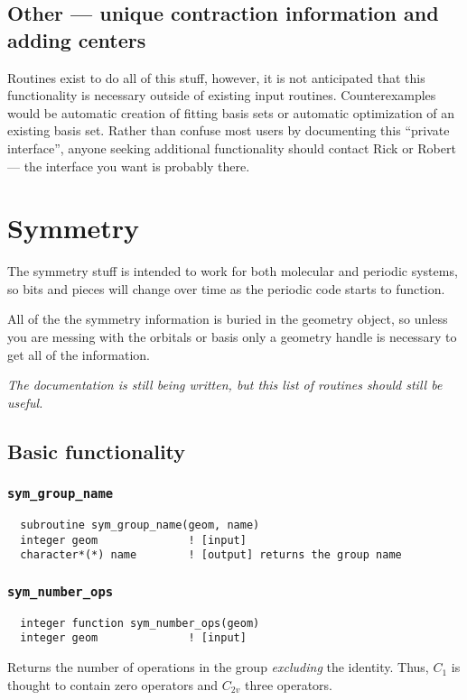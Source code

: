 \subsection{Other --- unique contraction information and adding
centers}

Routines exist to do all of this stuff, however, it is not anticipated
that this functionality is necessary outside of existing input
routines.  Counterexamples would be automatic creation of fitting
basis sets or automatic optimization of an existing basis set.
Rather than confuse most users by documenting this ``private
interface'', anyone seeking additional functionality should contact
Rick or Robert --- the interface you want is probably there.

\section{Symmetry}

  The symmetry stuff is intended to work for both molecular and
periodic systems, so bits and pieces will change over time as the
periodic code starts to function.

  All of the the symmetry information is buried in the geometry
object, so unless you are messing with the orbitals or basis only a
geometry handle is necessary to get all of the information.

{\em The documentation is still being written, but this list of
  routines should still be useful.}

\subsection{Basic functionality}

\subsubsection{{\tt sym\_group\_name}}
\begin{verbatim}
  subroutine sym_group_name(geom, name)
  integer geom              ! [input]
  character*(*) name        ! [output] returns the group name
\end{verbatim}

\subsubsection{{\tt sym\_number\_ops}}
\begin{verbatim}
  integer function sym_number_ops(geom)
  integer geom              ! [input]
\end{verbatim}
Returns the number of operations in the group {\em excluding} the
identity.  Thus, $C_1$ is thought to contain zero operators and
$C_{2v}$ three operators.

